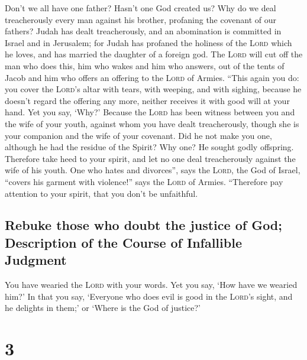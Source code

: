  Don't we all have one father? Hasn't one God created us?
Why do we deal treacherously every man against his brother, profaning
the covenant of our fathers?  Judah has dealt
treacherously, and an abomination is committed in Israel and in
Jerusalem; for Judah has profaned the holiness of the \textsc{Lord}
which he loves, and has married the daughter of a foreign god.
 The \textsc{Lord} will cut off the man who does this,
him who wakes and him who answers, out of the tents of Jacob and him who
offers an offering to the \textsc{Lord} of Armies. 
``This again you do: you cover the \textsc{Lord}'s altar with tears,
with weeping, and with sighing, because he doesn't regard the offering
any more, neither receives it with good will at your hand.
 Yet you say, `Why?' Because the \textsc{Lord} has been
witness between you and the wife of your youth, against whom you have
dealt treacherously, though she is your companion and the wife of your
covenant.  Did he not make you one, although he had the
residue of the Spirit? Why one? He sought godly offspring. Therefore
take heed to your spirit, and let no one deal treacherously against the
wife of his youth.  One who hates and divorces'', says
the \textsc{Lord}, the God of Israel, ``covers his garment with
violence!'' says the \textsc{Lord} of Armies. ``Therefore pay attention
to your spirit, that you don't be unfaithful.

\hypertarget{rebuke-those-who-doubt-the-justice-of-god-description-of-the-course-of-infallible-judgment}{%
\subsection{Rebuke those who doubt the justice of God; Description of
the Course of Infallible
Judgment}\label{rebuke-those-who-doubt-the-justice-of-god-description-of-the-course-of-infallible-judgment}}

 You have wearied the \textsc{Lord} with your words. Yet
you say, `How have we wearied him?' In that you say, `Everyone who does
evil is good in the \textsc{Lord}'s sight, and he delights in them;' or
`Where is the God of justice?'

\hypertarget{section-2}{%
\section{3}\label{section-2}}

